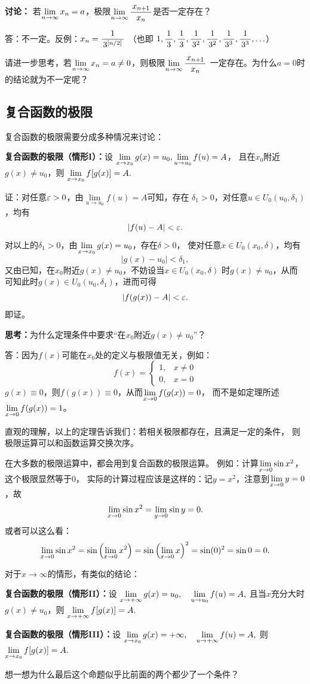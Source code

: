 \bs
{\bf 讨论：} 若$\lim\limits_{n\to\infty} x_n=a$，极限$\lim\limits_{n\to\infty}\displaystyle\frac{\,{x_{n+1}}\,}{\,{x_n}\,}$是否一定存在？

\ifhint
答：不一定。反例：$x_n=\displaystyle\frac{\,{1}\,}{\,{3^{[n/2]}}\,}$ （也即
$1, \displaystyle\frac{\,{1}\,}{\,{3}\,}, \displaystyle\frac{\,{1}\,}{\,{3}\,}, \displaystyle\frac{\,{1}\,}{\,{3^2}\,}, \displaystyle\frac{\,{1}\,}{\,{3^2}\,}, \displaystyle\frac{\,{1}\,}{\,{3^3}\,}, \displaystyle\frac{\,{1}\,}{\,{3^3}\,},\ldots$）

请进一步思考，若$\lim\limits_{n\to\infty} x_n=a\ne 0$，则极限$\lim\limits_{n\to\infty}\displaystyle\frac{\,{x_{n+1}}\,}{\,{x_n}\,}$
一定存在。为什么$a=0$时的结论就为不一定呢？
\fi

\subsection{复合函数的极限}

复合函数的极限需要分成多种情况来讨论：

\begin{thx}
	{\bf 复合函数的极限（情形I）：}设
	$\lim\limits_{x\to{x_0}}g(x)=u_0,\lim\limits_{u\to u_0}f(u)=A$，
	且在$x_0$附近$g(x)\ne u_0$，则
	$\lim\limits_{x\to{x_0}}f[g(x)]=A.$
\end{thx}

证：对任意$\varepsilon>0$，由$\lim\limits_{u\to u_0}f(u)=A$可知，存在
$\delta_1>0$，对任意$u\in U_0(u_0,\delta_1)$，均有
$$|f(u)-A|<\varepsilon.$$
对以上的$\delta_1>0$，由$\lim\limits_{x\to{x_0}}g(x)=u_0$，存在$\delta>0$，
使对任意$x\in U_0(x_0,\delta)$，均有
$$|g(x)-u_0|<\delta_1,$$
又由已知，在$x_0$附近$g(x)\ne u_0$，不妨设当$x\in U_0(x_0,\delta)$
时$g(x)\ne u_0$，从而可知此时$g(x)\in U_0(u_0,\delta_1)$，进而可得
$$|f(g(x))-A|<\varepsilon.$$
即证。\fin

\bs
{\bf 思考：}为什么定理条件中要求“在$x_0$附近$g(x)\ne u_0$”？

\bs
\ifhint
  答：因为$f(x)$可能在$x_0$处的定义与极限值无关，例如：
  $$f(x)=\left\{\begin{array}{ll}
  1,&x\ne0\\0,&x=0
  \end{array}\right.$$
  $g(x)\equiv 0$，则$f(g(x))\equiv0$，从而$\lim\limits_{x\to{0}}f(g(x))=0$，
  而不是如定理所述$\lim\limits_{x\to{0}}f(g(x))=1$。
\fi

直观的理解，以上的定理告诉我们：若相关极限都存在，且满足一定的条件，
则极限运算可以和函数运算交换次序。

在大多数的极限运算中，都会用到复合函数的极限运算。
例如：计算$\lim\limits_{x\to{0}}\sin x^2$，这个极限显然等于$0$，
实际的计算过程应该是这样的：记$y=x^2$，注意到$\lim\limits_{x\to{0}}y=0$，故
$$\lim\limits_{x\to{0}}\sin x^2=\lim_{y\to0}\sin y=0.$$
或者可以这么看：
$$\lim\limits_{x\to{0}}\sin x^2=\sin\left(\lim\limits_{x\to{0}}x^2\right)
=\sin\left(\lim\limits_{x\to{0}}x\right)^2
=\sin(0)^2=\sin0=0.$$

\bs
对于$x\to\infty$的情形，有类似的结论：
\begin{thx}
	{\bf 复合函数的极限（情形II）：}设
	$\lim\limits_{x\to{+\infty}}g(x)=u_0,\quad\lim\limits_{u\to u_0}f(u)=A,$
	且当$x$充分大时$g(x)\ne u_0$，则
	$\lim\limits_{x\to{+\infty}}f[g(x)]=A.$

	{\bf 复合函数的极限（情形III）：}设
	$\lim\limits_{x\to{x_0}}g(x)=+\infty,\quad\lim\limits_{u\to+\infty}f(u)=A,$
	则
	$\lim\limits_{x\to{x_0}}f[g(x)]=A.$
\end{thx}
想一想为什么最后这个命题似乎比前面的两个都少了一个条件？

